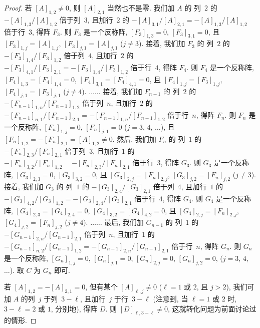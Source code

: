 \begin{proof}
    若 \([A]_{1,2} \neq 0\),
    则 \([A]_{2,1}\) 当然也不是零.
    我们加 \(A\) 的%
    列~\(2\) 的 \(-[A]_{1,3}/[A]_{1,2}\) 倍于列~\(3\),
    且加行~\(2\) 的 \(-[A]_{3,1}/[A]_{2,1} = -[A]_{1,3}/[A]_{1,2}\)
    倍于行~\(3\), 得阵 \(F_3\).
    则 \(F_3\) 是一个反称阵,
    \([F_3]_{1,3} = 0\),
    \([F_3]_{3,1} = 0\),
    且 \([F_3]_{1,j} = [A]_{1,j}\),
    \([F_3]_{j,1} = [A]_{j,1}\)
    (\(j \neq 3\)).
    接着, 我们加 \(F_3\) 的%
    列~\(2\) 的 \(-[F_3]_{1,4}/[F_3]_{1,2}\) 倍于列~\(4\),
    且加行~\(2\) 的 \(-[F_3]_{4,1}/[F_3]_{2,1}
    = -[F_3]_{1,4}/[F_3]_{1,2}\)
    倍于行~\(4\), 得阵 \(F_4\).
    则 \(F_4\) 是一个反称阵,
    \([F_4]_{1,3} = [F_4]_{1,4} = 0\),
    \([F_4]_{3,1} = [F_4]_{4,1} = 0\),
    且 \([F_4]_{1,j} = [F_3]_{1,j}\),
    \([F_4]_{j,1} = [F_3]_{j,1}\)
    (\(j \neq 4\)).
    \(\dots \dots\)
    接着, 我们加 \(F_{n-1}\) 的%
    列~\(2\) 的 \(-[F_{n-1}]_{1,n}/[F_{n-1}]_{1,2}\) 倍于列~\(n\),
    且加行~\(2\) 的 \(-[F_{n-1}]_{n,1}/[F_{n-1}]_{2,1}
    = -[F_{n-1}]_{1,n}/[F_{n-1}]_{1,2}\)
    倍于行~\(n\), 得阵 \(F_n\).
    则 \(F_n\) 是一个反称阵,
    \([F_n]_{1,j} = 0\),
    \([F_n]_{j,1} = 0\)
    (\(j = 3\), \(4\), \(\dots\)),
    且 \([F_n]_{1,2} = -[F_n]_{2,1} = [A]_{1,2} \neq 0\).
    然后, 我们加 \(F_n\) 的%
    列~\(1\) 的 \(-[F_n]_{2,3}/[F_n]_{2,1}\) 倍于列~\(3\),
    且加行~\(1\) 的 \(-[F_n]_{3,2}/[F_n]_{1,2} = -[F_n]_{2,3}/[F_n]_{2,1}\)
    倍于行~\(3\), 得阵 \(G_3\).
    则 \(G_3\) 是一个反称阵,
    \([G_3]_{2,3} = 0\),
    \([G_3]_{3,2} = 0\),
    且 \([G_3]_{2,j} = [F_n]_{2,j}\),
    \([G_3]_{j,2} = [F_n]_{j,2}\)
    (\(j \neq 3\)).
    接着, 我们加 \(G_3\) 的%
    列~\(1\) 的 \(-[G_3]_{2,4}/[G_3]_{2,1}\) 倍于列~\(4\),
    且加行~\(1\) 的 \(-[G_3]_{4,2}/[G_3]_{1,2} = -[G_3]_{2,4}/[G_3]_{2,1}\)
    倍于行~\(4\), 得阵 \(G_4\).
    则 \(G_4\) 是一个反称阵,
    \([G_4]_{2,3} = [G_4]_{2,4} = 0\),
    \([G_4]_{3,2} = [G_4]_{4,2} = 0\),
    且 \([G_4]_{2,j} = [F_n]_{2,j}\),
    \([G_4]_{j,2} = [F_n]_{j,2}\)
    (\(j \neq 4\)).
    \(\dots \dots\)
    最后, 我们加 \(G_{n-1}\) 的%
    列~\(1\) 的 \(-[G_{n-1}]_{2,n}/[G_{n-1}]_{2,1}\) 倍于列~\(n\),
    且加行~\(1\) 的 \(-[G_{n-1}]_{n,2}/[G_{n-1}]_{1,2}
    = -[G_{n-1}]_{2,n}/[G_{n-1}]_{2,1}\)
    倍于行~\(n\), 得阵 \(G_n\).
    则 \(G_n\) 是一个反称阵,
    \([G_n]_{1,j} = 0\),
    \([G_n]_{j,1} = 0\),
    \([G_n]_{2,j} = 0\),
    \([G_n]_{j,2} = 0\),
    (\(j = 3\), \(4\), \(\dots\)).
    取 \(C\) 为 \(G_n\) 即可.

    若 \([A]_{1,2} = -[A]_{2,1} = 0\),
    但有某个 \([A]_{\ell,j} \neq 0\)
    (\(\ell = 1\) 或 \(2\),
    且 \(j > 2\)),
    我们可加 \(A\) 的列~\(j\) 于列~\(3 - \ell\),
    且加行~\(j\) 于行~\(3 - \ell\)
    (注意到, 当 \(\ell = 1\) 或 \(2\) 时,
    \(3 - \ell = 2\) 或 \(1\), 分别地),
    得阵 \(D\).
    则 \([D]_{\ell,3 - \ell} \neq 0\),
    这就转化问题为前面讨论过的情形.


\end{proof}
